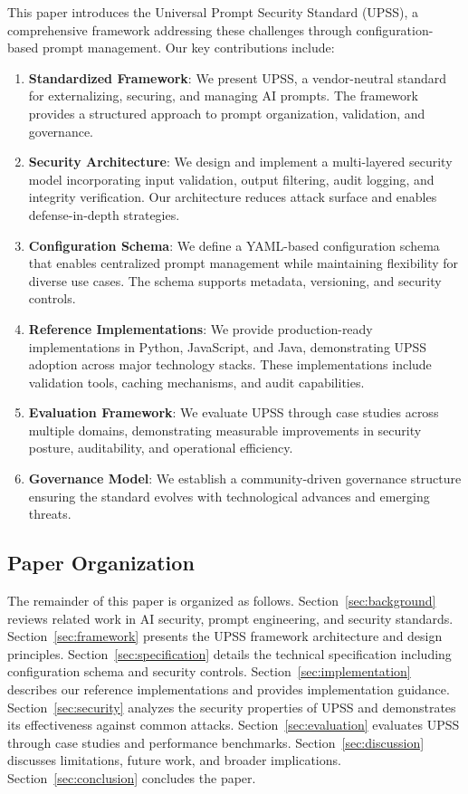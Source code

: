 This paper introduces the Universal Prompt Security Standard (UPSS), a comprehensive framework addressing these challenges through configuration-based prompt management. Our key contributions include:

\begin{enumerate}
    \item \textbf{Standardized Framework}: We present UPSS, a vendor-neutral standard for externalizing, securing, and managing AI prompts. The framework provides a structured approach to prompt organization, validation, and governance.
    
    \item \textbf{Security Architecture}: We design and implement a multi-layered security model incorporating input validation, output filtering, audit logging, and integrity verification. Our architecture reduces attack surface and enables defense-in-depth strategies.
    
    \item \textbf{Configuration Schema}: We define a YAML-based configuration schema that enables centralized prompt management while maintaining flexibility for diverse use cases. The schema supports metadata, versioning, and security controls.
    
    \item \textbf{Reference Implementations}: We provide production-ready implementations in Python, JavaScript, and Java, demonstrating UPSS adoption across major technology stacks. These implementations include validation tools, caching mechanisms, and audit capabilities.
    
    \item \textbf{Evaluation Framework}: We evaluate UPSS through case studies across multiple domains, demonstrating measurable improvements in security posture, auditability, and operational efficiency.
    
    \item \textbf{Governance Model}: We establish a community-driven governance structure ensuring the standard evolves with technological advances and emerging threats.
\end{enumerate}

\subsection{Paper Organization}

The remainder of this paper is organized as follows. Section~\ref{sec:background} reviews related work in AI security, prompt engineering, and security standards. Section~\ref{sec:framework} presents the UPSS framework architecture and design principles. Section~\ref{sec:specification} details the technical specification including configuration schema and security controls. Section~\ref{sec:implementation} describes our reference implementations and provides implementation guidance. Section~\ref{sec:security} analyzes the security properties of UPSS and demonstrates its effectiveness against common attacks. Section~\ref{sec:evaluation} evaluates UPSS through case studies and performance benchmarks. Section~\ref{sec:discussion} discusses limitations, future work, and broader implications. Section~\ref{sec:conclusion} concludes the paper.
